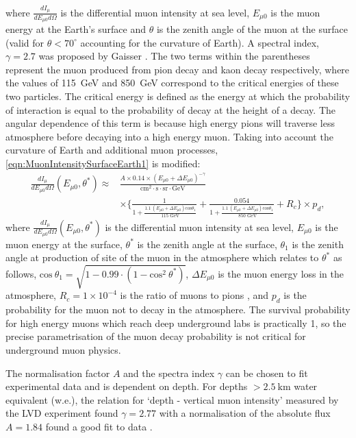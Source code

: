 where $\frac{dI_\mu}{dE_{\mu0}d\Omega}$ is the differential muon intensity at sea level, $E_{\mu0}$ is the muon energy at the Earth's surface and $\theta$ is the zenith angle of the muon at the surface (valid for $\theta<70^\circ$ accounting for the curvature of Earth). A spectral index, $\gamma=2.7$ was proposed by Gaisser \cite{Gaisser_Engel_Resconi_2016}. The two terms within the parentheses represent the muon produced from pion decay and kaon decay respectively, where the values of 115~GeV and 850~GeV correspond to the critical energies of these two particles. The critical energy is defined as the energy at which the probability of interaction is equal to the probability of decay at the height of a decay. The angular dependence of this term is because high energy pions will traverse less atmosphere before decaying into a high energy muon.
Taking into account the curvature of Earth and additional muon processes, \autoref{eqn:MuonIntensitySurfaceEarth1} is modified:
\begin{equation}
\label{eqn:MuonIntensitySurfaceEarth2}
\begin{split}    
    \frac{dI_\mu}{dE_{\mu0}d\Omega}(E_{\mu0},\theta^*)\approx&\frac{A\times 0.14\times (E_{\mu0}+\Delta E_{\mu0})^{-\gamma}}{\text{cm}^2\cdot\text{s}\cdot\text{sr}\cdot\text{GeV}}\\
    &\times\Biggl\{\frac{1}{1+\frac{1.1\:(E_{\mu0}+\Delta E_{\mu0})\text{cos}\theta_1}{115\text{ GeV}}}+\frac{0.054}{1+\frac{1.1\:(E_{\mu0}+\Delta E_{\mu0})\text{cos}\theta_1}{850\text{ GeV}}}+R_c\Biggl\}\times p_d,
\end{split}
\end{equation}
where $\frac{dI_\mu}{dE_{\mu0}d\Omega}(E_{\mu0},\theta^*)$ is the differential muon intensity at sea level, $E_{\mu0}$ is the muon energy at the surface, $\theta^*$ is the zenith angle at the surface, $\theta_1$ is the zenith angle at production of site of the muon in the atmosphere which relates to $\theta^*$ as follows, $\text{cos}\:\theta_1=\sqrt{1-0.99\cdot(1-\text{cos}^2\:\theta^*)}$, $\Delta E_{\mu0}$ is the muon energy loss in the atmosphere, $R_c=1\times10^{-4}$ is the ratio of muons to pions \cite{LVD:1998lir}, and $p_d$ is the probability for the muon not to decay in the atmosphere. The survival probability for high energy muons which reach deep underground labs is practically 1, so the precise parametrisation of the muon decay probability is not critical for underground muon physics.

The normalisation factor $A$ and the spectra index $\gamma$ can be chosen to fit experimental data and is dependent on depth. For depths $>2.5~\text{km}$ water equivalent (w.e.), the relation for `depth - vertical muon intensity' measured by the LVD experiment found $\gamma=2.77$ with a normalisation of the absolute flux $A=1.84$ found a good fit to data \cite{LVD:1998lir}.


